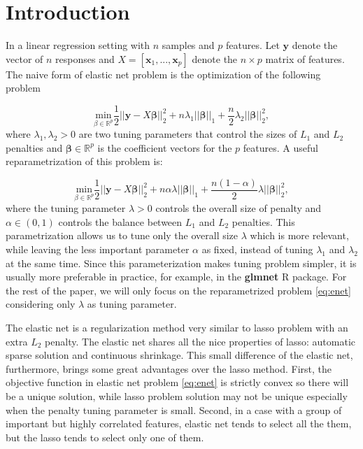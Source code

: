 \section{Introduction}

In a linear regression setting with $n$ samples and $p$ features. Let $\boldsymbol y$ denote the vector of $n$ responses and $X=[\boldsymbol x_1,...,\boldsymbol x_p]$ denote the $n\times p$ matrix of features. The naive form of elastic net problem \citep{zou2005} is the optimization of the following problem 

\begin{equation}
    \label{eq:enet0}
    \underset{\beta\in \mathbb{R}^p}{\mathrm{min}}\frac{1}{2}||\boldsymbol y-X\boldsymbol\beta||_2^2+n\lambda_1||\boldsymbol\beta||_1+\frac{n}{2}\lambda_2||\boldsymbol\beta||_2^2,
\end{equation}
where $\lambda_1,\lambda_2> 0$ are two tuning parameters that control the sizes of $L_1$ and $L_2$ penalties and $\boldsymbol\beta\in\mathbb{R}^p$ is the coefficient vectors for the $p$ features. A useful reparametrization of this problem is:

\begin{equation}
    \label{eq:enet}
    \underset{\beta\in \mathbb{R}^p}{\mathrm{min}}\frac{1}{2}||\boldsymbol y-X\boldsymbol\beta||_2^2+n\alpha\lambda||\boldsymbol\beta||_1+\frac{n(1-\alpha)}{2}\lambda||\boldsymbol\beta||_2^2,
\end{equation}
where the tuning parameter $\lambda>0$ controls the overall size of penalty and $\alpha\in(0,1)$ controls the balance between $L_1$ and $L_2$ penalties. This parametrization allows us to tune only the overall size $\lambda$ which is more relevant, while leaving the less important parameter $\alpha$ as fixed, instead of tuning $\lambda_1$ and $\lambda_2$ at the same time. Since this parameterization makes tuning problem simpler, it is usually more preferable in practice, for example, in the \textbf{glmnet} R package. For the rest of the paper, we will only focus on the reparametrized problem \eqref{eq:enet} considering only $\lambda$ as tuning parameter.

The elastic net is a regularization method very similar to lasso problem \citep{tibshirani1996} with an extra $L_2$ penalty. The elastic net shares all the nice properties of lasso: automatic sparse solution and continuous shrinkage. This small difference of the elastic net, furthermore, brings some great advantages over the lasso method. First, the objective function in elastic net problem \eqref{eq:enet} is strictly convex so there will be a unique solution, while lasso problem solution may not be unique especially when the penalty tuning parameter is small. Second, in a case with a group of important but highly correlated features, elastic net tends to select all the them, but the lasso tends to select only one of them.

